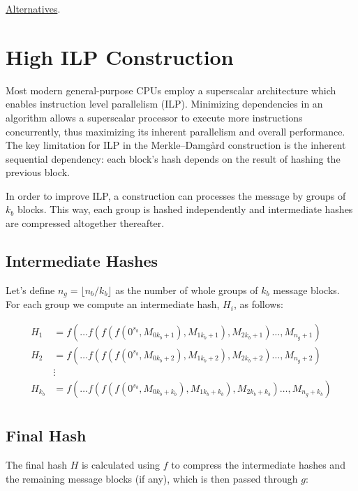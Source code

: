 \documentclass[11pt]{article}
\begin{document}
\href{https://www.researchgate.net/publication/322094216_Merkle-Damgard_Construction_Method_and_Alternatives_A_Review}{Alternatives}.

\section{High ILP Construction} \label{highilp}

Most modern general-purpose CPUs employ a superscalar architecture which enables instruction level parallelism (ILP). 
Minimizing dependencies in an algorithm allows a superscalar processor to execute more instructions concurrently, thus maximizing its inherent parallelism and overall performance.
The key limitation for ILP in the Merkle–Damgård construction is the inherent sequential dependency: each block's hash depends on the result of hashing the previous block.

In order to improve ILP, a construction can processes the message by groups of \( k_b \) blocks. This way, each group is hashed independently and intermediate hashes are compressed altogether thereafter.

\subsection{Intermediate Hashes}

Let's define \( n_g = \lfloor {n_b}/{k_b} \rfloor \) as the number of whole groups of \( k_b \) message blocks. \\
For each group we compute an intermediate hash, \( H_i \), as follows:

\begin{align*}
H_{1} &= f(\ldots f(f(f(0^{s_b}, M_{0k_b + 1}), M_{1k_b + 1}), M_{2k_b + 1})\ldots, M_{n_g + 1}) \\
H_{2} &= f(\ldots f(f(f(0^{s_b}, M_{0k_b + 2}), M_{1k_b + 2}), M_{2k_b + 2})\ldots, M_{n_g + 2}) \\
&\vdots \\
H_{k_b} &= f(\ldots f(f(f(0^{s_b}, M_{0k_b + k_b}), M_{1k_b + k_b}), M_{2k_b + k_b})\ldots, M_{n_g + k_b}) \\
\end{align*}

\subsection{Final Hash}

The final hash \( H \) is calculated using \( f \) to compress the intermediate hashes and the remaining message blocks (if any), which is then passed through \( g \):
\end{document}
